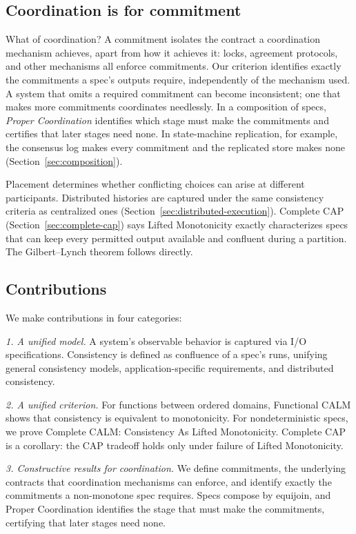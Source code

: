\documentclass[sigconf]{cidr-2027}
\theoremstyle{remark}
\newcommand{\commitment}{commitment\xspace}
\newcommand{\commitments}{commitments\xspace}
\newcommand{\spectype}[1][]{I/O specification#1\xspace}
\begin{document}
\subsection{Coordination is for \commitment}
What of coordination?  A \commitment isolates the contract a coordination
mechanism achieves, apart from how it achieves it: locks, agreement protocols,
and other mechanisms all enforce \commitments.  Our criterion identifies exactly
the \commitments a spec's outputs require, independently of the mechanism used.
A system that omits a required \commitment can become inconsistent; one that makes more \commitments coordinates needlessly.  In a composition of specs, \emph{Proper Coordination}
identifies which stage must make the \commitments and certifies that later
stages need none.  In state-machine replication, for example, the consensus log
makes every \commitment and the replicated store makes none
(Section~\ref{sec:composition}).

Placement determines whether conflicting choices can arise at different
participants.  Distributed histories are captured under the same consistency criteria as
centralized ones (Section~\ref{sec:distributed-execution}).  Complete CAP
(Section~\ref{sec:complete-cap}) says Lifted Monotonicity exactly characterizes specs
that can keep every permitted output available and confluent during a
partition.  The Gilbert--Lynch theorem follows directly.

\subsection{Contributions}
We make contributions in four categories:

\noindent
\emph{1. A unified model.} A system's observable behavior is captured via
        \spectype[s]. Consistency is defined as
        confluence of a spec's runs, unifying general consistency models,
        application-specific requirements, and distributed consistency.

\noindent
\emph{2. A unified criterion.} For functions between ordered domains,
        Functional CALM shows that consistency is equivalent to monotonicity. For nondeterministic specs,
        we prove Complete CALM: Consistency As Lifted Monotonicity. Complete CAP is a corollary:
        the CAP tradeoff holds only under failure of Lifted Monotonicity.

\noindent
\emph{3. Constructive results for coordination.} We define \commitments,
        the underlying contracts that coordination mechanisms can enforce,
        and identify exactly the \commitments a non-monotone spec requires.
        Specs compose by equijoin, and Proper Coordination identifies the stage
        that must make the \commitments, certifying that later stages need
        none.
\end{document}
